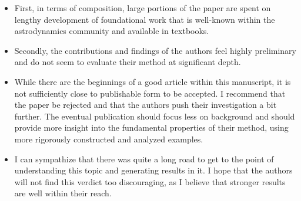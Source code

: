 \documentclass[11pt]{article}
\begin{document}
\begin{itemize}

\item 
    \begin{itshape}
First, in terms of composition, large portions of the paper are spent on lengthy development of foundational work that is well-known within the astrodynamics community and available in textbooks. 
\end{itshape}
\item 
    \begin{itshape}
        Secondly, the contributions and findings of the authors feel highly preliminary and do not seem to evaluate their method at significant depth.
    \end{itshape}

\item
    \begin{itshape}
While there are the beginnings of a good article within this manuscript, it is not sufficiently close to publishable form to be accepted.  I recommend that the paper be rejected and that the authors push their investigation a bit further.  The eventual publication should focus less on background and should provide more insight into the fundamental properties of their method, using more rigorously constructed and analyzed examples.
\end{itshape}
\item 
    \begin{itshape}
I can sympathize that there was quite a long road to get to the point of understanding this topic and generating results in it. I hope that the authors will not find this verdict too discouraging, as I believe that stronger results are well within their reach.
\end{itshape}
\end{itemize}
\end{document}
